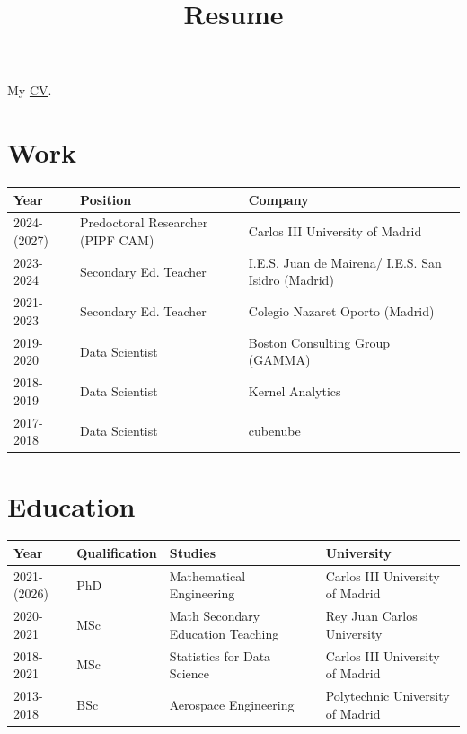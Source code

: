 \title{Resume}

My \href{/resume.pdf}{ CV}.

\section*{Work}

\begin{tabular}{lll}
  \hline
  Year & Position & Company \\
  \hline
  2024-(2027) & Predoctoral Researcher (PIPF CAM) & Carlos III University of Madrid \\
  2023-2024 & Secondary Ed. Teacher & I.E.S. Juan de Mairena/ I.E.S. San Isidro (Madrid) \\
  2021-2023 & Secondary Ed. Teacher & Colegio Nazaret Oporto (Madrid) \\
  2019-2020 & Data Scientist & Boston Consulting Group (GAMMA) \\
  2018-2019 & Data Scientist & Kernel Analytics \\
  2017-2018 & Data Scientist & cubenube \\
  \hline
\end{tabular}

\section*{Education}

\begin{tabular}{llll}
  \hline
  Year & Qualification & Studies & University \\
  \hline
  2021-(2026) & PhD & Mathematical Engineering & Carlos III University of Madrid \\
  2020-2021 & MSc & Math Secondary Education Teaching & Rey Juan Carlos University \\
  2018-2021 & MSc & Statistics for Data Science & Carlos III University of Madrid \\
  2013-2018 & BSc & Aerospace Engineering & Polytechnic University of Madrid \\
  \hline
\end{tabular}

